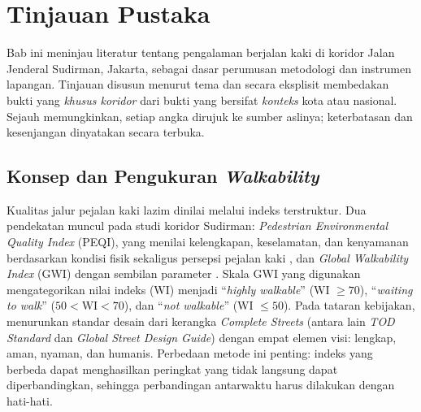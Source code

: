 \documentclass[11pt,a4paper]{report}
\begin{document}
\chapter{Tinjauan Pustaka}       %

Bab ini meninjau literatur tentang pengalaman berjalan kaki di koridor Jalan Jenderal
Sudirman, Jakarta, sebagai dasar perumusan metodologi dan instrumen lapangan. Tinjauan
disusun menurut tema dan secara eksplisit membedakan bukti yang \emph{khusus koridor} dari
bukti yang bersifat \emph{konteks} kota atau nasional. Sejauh memungkinkan, setiap angka
dirujuk ke sumber aslinya; keterbatasan dan kesenjangan dinyatakan secara terbuka.

\section{Konsep dan Pengukuran \textit{Walkability}}
Kualitas jalur pejalan kaki lazim dinilai melalui indeks terstruktur. Dua pendekatan muncul
pada studi koridor Sudirman: \emph{Pedestrian Environmental Quality Index} (PEQI), yang menilai
kelengkapan, keselamatan, dan kenyamanan berdasarkan kondisi fisik sekaligus persepsi pejalan
kaki \autocite{dwisadana2024}, dan \emph{Global Walkability Index} (GWI) dengan sembilan
parameter \autocite{ridhani2015,mulyadi2022}. Skala GWI yang digunakan \textcite{mulyadi2022}
mengategorikan nilai indeks (WI) menjadi ``\textit{highly walkable}'' (WI \(\geq 70\)),
``\textit{waiting to walk}'' (\(50 < \text{WI} < 70\)), dan ``\textit{not walkable}''
(WI \(\leq 50\)). Pada tataran kebijakan, \textcite{itdp2019} menurunkan standar
desain dari kerangka \textit{Complete Streets} (antara lain \textit{TOD Standard} dan
\textit{Global Street Design Guide}) dengan empat elemen visi: lengkap, aman, nyaman, dan
humanis. %
Perbedaan metode ini penting: indeks yang berbeda dapat menghasilkan peringkat yang tidak
langsung dapat diperbandingkan, sehingga perbandingan antarwaktu harus dilakukan dengan hati-hati.
\end{document}

